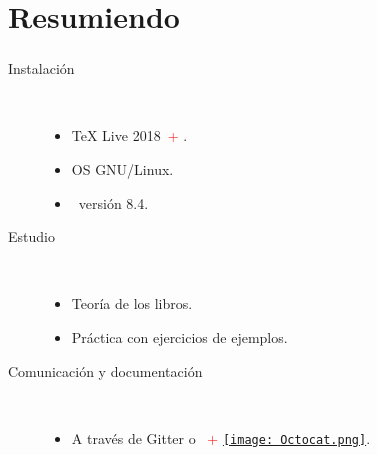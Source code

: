 \section{Resumiendo}
\begin{frame}[c]\frametitle{\insertsection}
\begin{description}
\item[Instalación] \hfill\\
\begin{itemize}
	\item \TeX{} Live 2018\ \textcolor{red}{+} \arara.
	\item OS GNU/Linux.
	\item \sage\ versión 8.4.
\end{itemize}

\item[Estudio]\hfill\\
\begin{itemize}
	\item Teoría de los libros.
	\item Práctica con ejercicios de ejemplos.
\end{itemize}

\item[Comunicación y documentación]\hfill\\
\begin{itemize}
	\item A través de Gitter o \hangouts\ \textcolor{red}{+} \href{https://github.com/carlosal1015/LaTeX-and-Friends}{\texttt{[image: Octocat.png]}}.
\end{itemize}
\end{description}

\end{frame}
